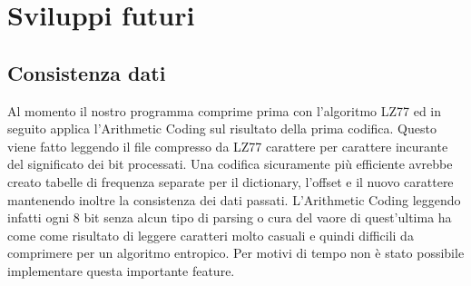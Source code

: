\documentclass{article}
\begin{document}
\section{Sviluppi futuri}

\subsection{Consistenza dati}

Al momento il nostro programma comprime prima con l'algoritmo LZ77 ed in seguito applica l'Arithmetic Coding sul risultato della prima codifica. Questo viene fatto leggendo il file compresso da LZ77 carattere per carattere incurante del significato dei bit processati. Una codifica sicuramente più efficiente avrebbe creato tabelle di frequenza separate per il dictionary, l'offset e il nuovo carattere mantenendo inoltre la consistenza dei dati passati. L'Arithmetic Coding leggendo infatti ogni 8 bit senza alcun tipo di parsing o cura del vaore di quest'ultima ha come come risultato di leggere caratteri molto casuali e quindi difficili da comprimere per un algoritmo entropico.
Per motivi di tempo non è stato possibile implementare questa importante feature.
\end{document}
